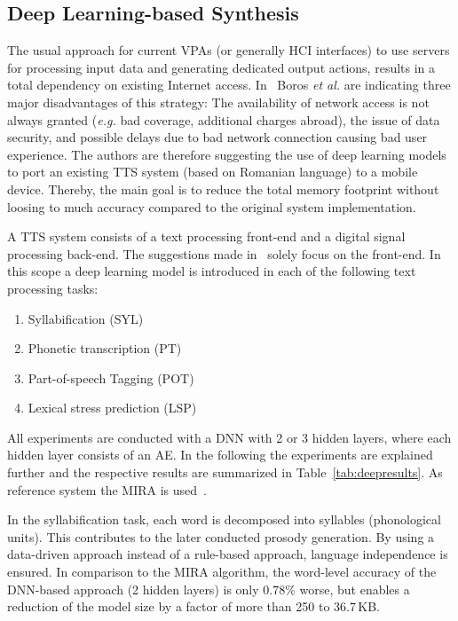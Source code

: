 \subsection{Deep Learning-based Synthesis}
\label{subsec:deepembedded}

The usual approach for current \acfp{VPA} (or generally \ac{HCI} interfaces) to use servers for processing input data and generating dedicated output actions, results in a total dependency on existing Internet access. In~\cite{boros:robust} Boros \textit{et al.} are indicating three major disadvantages of this strategy: The availability of network access is not always granted (\textit{e.g.} bad coverage, additional charges abroad), the issue of data security, and possible delays due to bad network connection causing bad user experience. The authors are therefore suggesting the use of deep learning models to port an existing \ac{TTS} system (based on Romanian language) to a mobile device. Thereby, the main goal is to reduce the total memory footprint without loosing to much accuracy compared to the original system implementation.

A \ac{TTS} system consists of a text processing front-end and a digital signal processing back-end. The suggestions made in~\cite{boros:robust} solely focus on the front-end. In this scope a deep learning model is introduced in each of the following text processing tasks:

\begin{enumerate}[label=\arabic*.]		%
	\parskip0.25em
	\bfseries
	\item Syllabification (SYL)
	\item Phonetic transcription (PT)
	\item Part-of-speech Tagging (POT)
	\item Lexical stress prediction (LSP)
\end{enumerate}

All experiments are conducted with a \ac{DNN} with 2 or 3 hidden layers, where each hidden layer consists of an \acf{AE}.
In the following the experiments are explained further and the respective results are summarized in Table~\ref{tab:deepresults}. As reference system the \ac{MIRA} is used~\cite{boros:mira}.

In the syllabification task, each word is decomposed into syllables (phonological units). This contributes to the later conducted prosody generation. By using a data-driven approach instead of a rule-based approach, language independence is ensured. In comparison to the \ac{MIRA} algorithm, the word-level accuracy of the \ac{DNN}-based approach (2 hidden layers) is only 0.78\% worse, but enables a reduction of the model size by a factor of more than 250 to 36.7\,KB.

